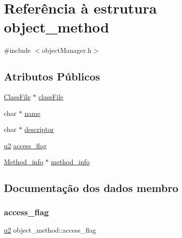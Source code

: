 \hypertarget{structobject__method}{}\section{Referência à estrutura object\+\_\+method}
\label{structobject__method}


{\ttfamily \#include $<$object\+Manager.\+h$>$}

\subsection*{Atributos Públicos}
\begin{DoxyCompactItemize}
\item 
\hyperlink{struct_class_file}{Class\+File} $\ast$ \hyperlink{structobject__method_aae76f71a5ba4f10dcc3a77b7861be242}{class\+File}
\item 
char $\ast$ \hyperlink{structobject__method_acf958be3e2938f93baa1215620f42348}{name}
\item 
char $\ast$ \hyperlink{structobject__method_a80a6504d57919c614fa2e30d73df4449}{descriptor}
\item 
\hyperlink{util_8h_a55ef8d87fd202b8417704c089899c5b9}{u2} \hyperlink{structobject__method_a175b1d909a124db0d4554ccf06f2bb74}{access\+\_\+flag}
\item 
\hyperlink{struct_method__info}{Method\+\_\+info} $\ast$ \hyperlink{structobject__method_a1d3a60721432806f7179aa991e188a17}{method\+\_\+info}
\end{DoxyCompactItemize}


\subsection{Documentação dos dados membro}
\mbox{\label{structobject__method_a175b1d909a124db0d4554ccf06f2bb74}} 
\subsubsection{\texorpdfstring{access\+\_\+flag}{access\_flag}}
{\footnotesize\ttfamily \hyperlink{util_8h_a55ef8d87fd202b8417704c089899c5b9}{u2} object\+\_\+method\+::access\+\_\+flag}

\mbox{\label{structobject__method_aae76f71a5ba4f10dcc3a77b7861be242}} 
